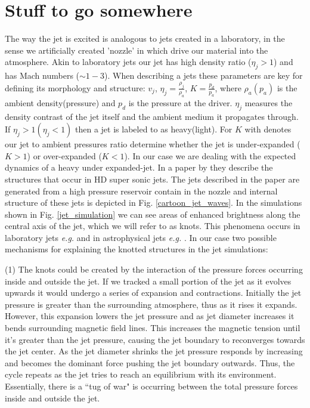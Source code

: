 \documentclass[12pt]{ociamthesis}
\newcommand{\fref}[1]{Fig. \eqref{#1}}
\begin{document}
\section{Stuff to go somewhere}
The way the jet is excited is analogous to jets created in a laboratory, in the sense we artificially created 'nozzle' in which drive our material into the atmosphere. Akin to laboratory jets our jet has high density ratio ($\eta_j >1$) and has Mach numbers ($\sim 1-3$). When describing a jets these parameters are key for defining its morphology and structure: $v_j$, $\eta_j = \frac{\rho_j}{\rho_a}$, $K = \frac{p_{d}}{p_a}$, where $\rho_a(p_a)$ is the ambient density(pressure) and $p_{d}$ is the pressure at the driver. $\eta_j$ measures the density contrast of the jet itself and the ambient medium it propagates through. If $\eta_j>1(\eta_j<1)$ then a jet is labeled to as heavy(light). For $K$ with denotes our jet to ambient pressures ratio determine whether the jet is under-expanded ($K>1$) or over-expanded ($K<1$). In our case we are dealing with the expected dynamics of a heavy under expanded-jet. In a paper by \cite{Norman1982} they describe the structures that occur in HD super sonic jets. The jets described in the paper are generated from a high pressure reservoir contain in the nozzle and internal structure of these jets is depicted in \fref{cartoon_jet_waves}. In the simulations shown in \fref{jet_simulation} we can see areas of enhanced brightness along the central axis of the jet, which we will refer to as knots. This phenomena occurs in laboratory jets \textit{e.g.} \citep{Ono2014,Edgington-Mitchell2014,Menon2010} and in astrophysical jets \textit{e.g.} \cite{Blandford2019,Belan2011,DeGouveiaDalPino2005,Birkinshaw1996}. In our case two possible mechanisms for explaining the knotted structures in the jet simulations: \\
\par (1) The knots could be created by the interaction of the pressure forces occurring inside and outside the jet. If we tracked a small portion of the jet as it evolves upwards it would undergo a series of expansion and contractions. Initially the jet pressure is greater than the surrounding atmosphere, thus as it rises it expands. However, this expansion lowers the jet pressure and as jet diameter increases it bends surrounding magnetic field lines. This increases the magnetic tension until it's greater than the jet pressure, causing the jet boundary to reconverges towards the jet center. As the jet diameter shrinks the jet pressure responds by increasing and becomes the dominant force pushing the jet boundary outwards. Thus, the cycle repeats as the jet tries to reach an equilibrium with its environment. Essentially, there is a ``tug of war" is occurring between the total pressure forces inside and outside the jet.  \\
\end{document}
